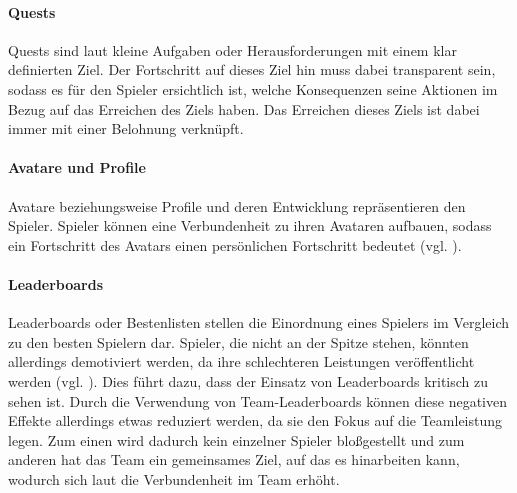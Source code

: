 \documentclass[
	oneside,  %
	ngerman, 
	final, 
	11pt, 
	a4paper, 
	1.1headlines, 
	headinclude=false, 
	footinclude=false, 
	mpinclude=false, 
	pagesize, 
	onecolumn, 
	titlepage, 
	parskip=half, 
	headsepline, 
	chapterprefix=false, 
	version=first, 
	listof=totoc, 
	bibliography=totoc, 
	toc=graduated, 
	fleqn
]{scrbook}
\begin{document}
\paragraph{Quests}
Quests sind laut \cite{SH2014} kleine Aufgaben oder Herausforderungen mit einem klar definierten Ziel.
Der Fortschritt auf dieses Ziel hin muss dabei transparent sein, sodass es für den Spieler ersichtlich ist, welche Konsequenzen seine Aktionen im Bezug auf das Erreichen des Ziels haben.
Das Erreichen dieses Ziels ist dabei immer mit einer Belohnung verknüpft.

\paragraph{Avatare und Profile}
Avatare beziehungsweise Profile und deren Entwicklung repräsentieren den Spieler.
Spieler können eine Verbundenheit zu ihren Avataren aufbauen, sodass ein Fortschritt des Avatars einen persönlichen Fortschritt bedeutet (vgl. \cite{SH2014}).

\paragraph{Leaderboards}
Leaderboards oder Bestenlisten stellen die Einordnung eines Spielers im Vergleich zu den besten Spielern dar.
Spieler, die nicht an der Spitze stehen, könnten allerdings demotiviert werden, da ihre schlechteren Leistungen veröffentlicht werden (vgl. \cite{SH2014}).
Dies führt dazu, dass der Einsatz von Leaderboards kritisch zu sehen ist.
Durch die Verwendung von Team-Leaderboards können diese negativen Effekte allerdings etwas reduziert werden, da sie den Fokus auf die Teamleistung legen.
Zum einen wird dadurch kein einzelner Spieler \glqq bloßgestellt\grqq{} und zum anderen hat das Team ein gemeinsames Ziel, auf das es hinarbeiten kann, wodurch sich laut \cite{SH2014} die Verbundenheit im Team erhöht. 
\end{document}
